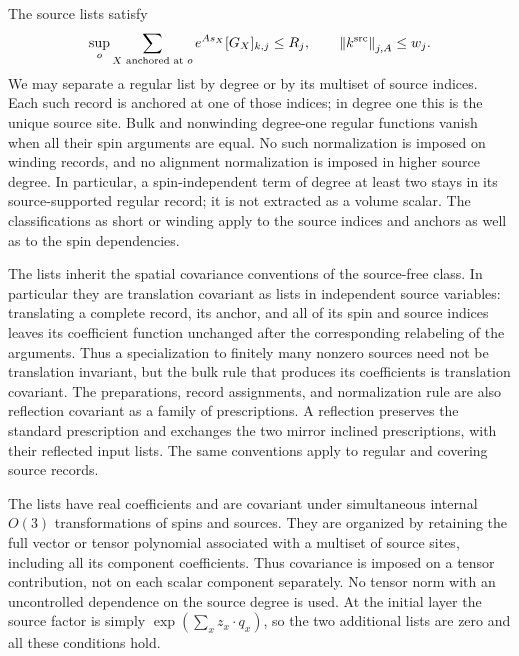 The source lists satisfy
\begin{equation}
 \sup_o\sum_{X\text{ anchored at }o}e^{As_X}[G_X]_{k,j}
       \le R_j,
 \qquad
 \left\lVert k^{\mathrm{src}}\right\rVert_{j,A}\le w_j.
 \label{eq:orig-27}
\end{equation}
We may separate a regular list by degree or by its multiset of source
indices.  Each such record is anchored at one of those indices; in
degree one this is the unique source site.  Bulk and nonwinding
degree-one regular functions vanish when all their spin arguments
are equal.  No such normalization is imposed on winding records,
and no alignment normalization is imposed in higher source degree.
In particular, a spin-independent term of degree at least two stays
in its source-supported regular record; it is not extracted as a
volume scalar.
The classifications as short or winding apply to the source indices
and anchors as well as to the spin dependencies.

The lists inherit the spatial covariance conventions of the
source-free class.  In particular they are translation covariant
as lists in independent source variables: translating a complete
record, its anchor, and all of its spin and source indices leaves
its coefficient function unchanged after the corresponding
relabeling of the arguments.  Thus a specialization to finitely
many nonzero sources need not be translation invariant, but the
bulk rule that produces its coefficients is translation covariant.
The preparations, record assignments, and normalization rule are
also reflection covariant as a family of prescriptions.  A
reflection preserves the standard prescription and exchanges
the two mirror inclined prescriptions, with their reflected
input lists.  The same conventions apply to regular and
covering source records.

The lists have real coefficients and are covariant under simultaneous
internal $O(3)$ transformations of spins and sources.  They are
organized by retaining the full vector or tensor polynomial associated
with a multiset of source sites, including all its component
coefficients.  Thus covariance is imposed on a tensor contribution,
not on each scalar component separately.  No tensor norm with an
uncontrolled dependence on the source degree is used.  At the initial
layer the source factor is simply $\exp(\sum_x z_x\cdot q_x)$, so the
two additional lists are zero and all these conditions hold.

